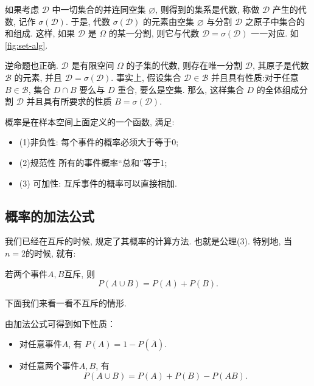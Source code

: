 如果考虑 $\mathscr{D}$ 中一切集合的并连同空集 $\varnothing$, 则得到的集系是代数, 称做 $\mathscr{D}$ 产生的代数, 记作 $\sigma(\mathscr{D})$. 于是, 代数 $\sigma(\mathscr{D})$ 的元素由空集 $\varnothing$ 与分割 $\mathscr{D}$ 之原子中集合的和组成.
这样, 如果 $\mathscr{D}$ 是 $\Omega$ 的某一分割, 则它与代数 $\mathscr{D}=\sigma(\mathscr{D})$ 一一对应. 如\cref{fig:set-alg}.



逆命题也正确. $\mathscr{D}$ 是有限空间 $\Omega$ 的子集的代数, 则存在唯一分割 $\mathscr{D}$, 其原子是代数 $\mathscr{B}$ 的元素, 并且 $\mathscr{D}=\sigma(\mathscr{D})$. 事实上, 假设集合 $\mathscr{D} \in \mathscr{B}$ 并且具有性质:对于任意 $B \in \mathscr{B}$, 集合 $D \cap B$ 要么与 $D$ 重合, 要么是空集. 那么, 这样集合 $D$ 的全体组成分割 $\mathscr{D}$ 并且具有所要求的性质 $B=\sigma(\mathscr{D})$. 



\begin{takeaway}
    概率是在样本空间上面定义的一个函数, 满足: 
    \begin{itemize}
        \item (1)非负性: 每个事件的概率必须大于等于0; 
        \item (2)规范性
        所有的事件概率``总和''等于1; 
        \item (3) 可加性: 互斥事件的概率可以直接相加.
    \end{itemize}
\end{takeaway}
    


\subsection{概率的加法公式}
我们已经在互斥的时候, 规定了其概率的计算方法. 也就是公理(3). 特别地, 当$n=2$的时候, 就有: 
\begin{proposition}[加法公式]
    若两个事件$A,B$互斥, 则
    $$P(A\cup B)=P(A)+P(B).$$
\end{proposition}

下面我们来看一看不互斥的情形.
\begin{remark}
    由加法公式可得到如下性质：
    \begin{itemize}
        \item 对任意事件$A$, 有
              $P(A)=1-P\left(\overline{A}\right).$
        \item 对任意两个事件$A,B$, 有
              $$P(A\cup B)=P(A)+P(B)-P(AB).$$
    \end{itemize}
\end{remark}

